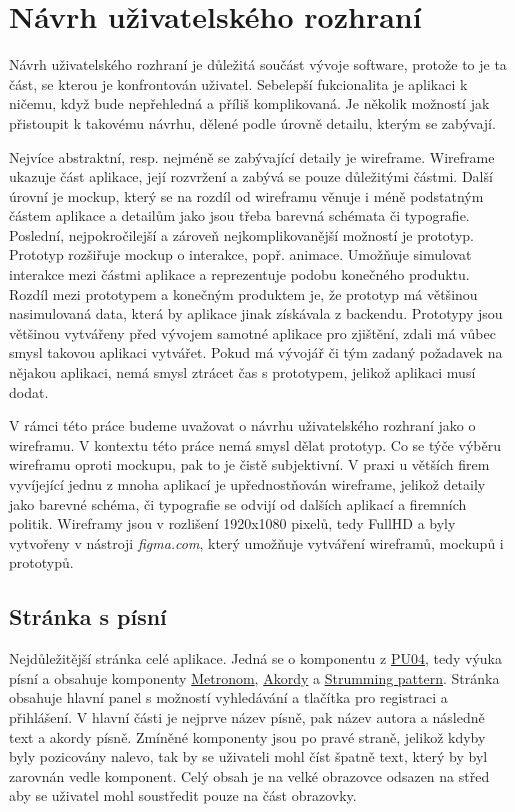 \section{Návrh uživatelského rozhraní}
\label{sc:wireframes}
Návrh uživatelského rozhraní je důležitá součást vývoje software, protože to je ta část, se kterou je konfrontován uživatel. Sebelepší fukcionalita je aplikaci k ničemu, když bude nepřehledná a příliš komplikovaná. Je několik možností jak přistoupit k takovému návrhu, dělené podle úrovně detailu, kterým se zabývají.

Nejvíce abstraktní, resp. nejméně se zabývající detaily je wireframe. Wireframe ukazuje část aplikace, její rozvržení a zabývá se pouze důležitými částmi. Další úrovní je mockup, který se na rozdíl od wireframu věnuje i méně podstatným částem aplikace a detailům jako jsou třeba barevná schémata či typografie. Poslední, nejpokročilejší a zároveň nejkomplikovanější možností je prototyp. Prototyp rozšiřuje mockup o interakce, popř. animace. Umožňuje simulovat interakce mezi částmi aplikace a reprezentuje podobu konečného produktu. Rozdíl mezi prototypem a konečným produktem je, že prototyp má většinou nasimulovaná data, která by aplikace jinak získávala z backendu. Prototypy jsou většinou vytvářeny před vývojem samotné aplikace pro zjištění, zdali má vůbec smysl takovou aplikaci vytvářet. Pokud má vývojář či tým zadaný požadavek na nějakou aplikaci, nemá smysl ztrácet čas s prototypem, jelikož aplikaci musí dodat.

V rámci této práce budeme uvažovat o návrhu uživatelského rozhraní jako o wireframu. V kontextu této práce nemá smysl dělat prototyp. Co se týče výběru wireframu oproti mockupu, pak to je čistě subjektivní. V praxi u větších firem vyvíjející jednu z mnoha aplikací je upřednostňován wireframe, jelikož detaily jako barevné schéma, či typografie se odvijí od dalších aplikací a firemních politik. Wireframy jsou v rozlišení 1920x1080 pixelů, tedy FullHD a byly vytvořeny v nástroji \emph{figma.com}, který umožňuje vytváření wireframů, mockupů i prototypů.

\subsection{Stránka s písní}
\label{ss:wireframe_song}
Nejdůležitější stránka celé aplikace. Jedná se o komponentu z \hyperref[uc04]{PU04}, tedy výuka písní a obsahuje komponenty \hyperref[uc1]{Metronom}, \hyperref[uc2]{Akordy} a \hyperref[uc3]{Strumming pattern}. Stránka obsahuje hlavní panel s možností vyhledávání a tlačítka pro registraci a přihlášení. V hlavní části je nejprve název písně, pak název autora a následně text a akordy písně. Zmíněné komponenty jsou po pravé straně, jelikož kdyby byly pozicovány nalevo, tak by se uživateli mohl číst špatně text, který by byl zarovnán vedle komponent. Celý obsah je na velké obrazovce odsazen na střed aby se uživatel mohl soustředit pouze na část obrazovky.

